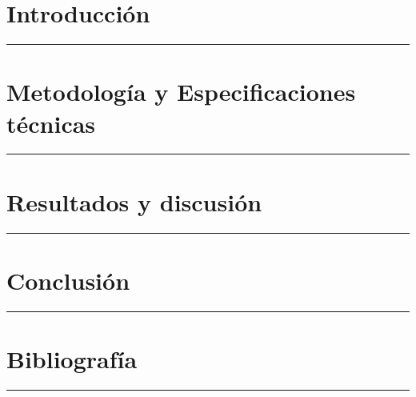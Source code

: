 \documentclass[a4paper,11pt]{article}
\newcommand{\sinmarcaagua}{
  \ClearShipoutPictureBG
}
\begin{document}
\newpage
\thispagestyle{main}
\mbox{}
\newpage

\thispagestyle{main}
\renewcommand{\listtablename}{Índice de tablas}
\renewcommand{\cftafterlottitle}{%
  \par\nobreak
  {\color{tfgazul}\rule{\textwidth}{3pt}}%
  \par\nobreak
}
\listoftables
\thispagestyle{main}

\newpage
\thispagestyle{main}
\mbox{}
\newpage

\section{Introducción}
{\color{tfgazul}\rule{\textwidth}{3pt}}


\newpage
\section{Metodología y Especificaciones técnicas}
{\color{tfgazul}\rule{\textwidth}{3pt}}


\newpage
\section{Resultados y discusión}
{\color{tfgazul}\rule{\textwidth}{3pt}}


\newpage
\section{Conclusión}
{\color{tfgazul}\rule{\textwidth}{3pt}}


\newpage
\section{Bibliografía}
{\color{tfgazul}\rule{\textwidth}{3pt}}


\renewcommand{\refname}{} 



\sinmarcaagua
\end{document}
